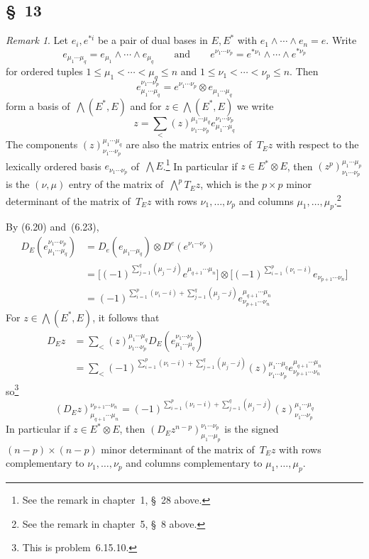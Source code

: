 \documentclass[letterpaper,12pt]{article}
\newcommand{\tprod}{\otimes}
\newcommand{\eprod}{\wedge}
\newcommand{\bigeprod}{\bigwedge}
\newcommand{\medeprod}{{\textstyle\bigeprod}}
\newcommand{\multi}[4]{#2_{#3}#1\cdots#1#2_{#4}}
\newcommand{\eprods}[3]{\multi{\eprod}{#1}{#2}{#3}}
\theoremstyle{definition}
\theoremstyle{remark}
\newtheorem*{rmk}{Remark}
\begin{document}
\subsection*{\S~13}
\begin{rmk}
Let \(e_i,e^{*i}\) be a pair of dual bases in \(E,E^*\) with \(\eprods{e}{1}{n}=e\). Write
\[e_{\mu_1\cdots\mu_q}=\eprods{e}{\mu_1}{\mu_q}\qquad\text{and}\qquad e^{\nu_1\cdots\nu_p}=e^{*\nu_1}\eprod\cdots\eprod e^{*\nu_p}\]
for ordered tuples \(1\le\mu_1<\cdots<\mu_q\le n\) and \(1\le\nu_1<\cdots<\nu_p\le n\). Then
\[e_{\mu_1\cdots\mu_q}^{\nu_1\cdots\nu_p}=e^{\nu_1\cdots\nu_p}\tprod e_{\mu_1\cdots\mu_q}\]
form a basis of~\(\medeprod(E^*,E)\) and for \(z\in\medeprod(E^*,E)\) we write
\[z=\sum_{<}(z)^{\mu_1\cdots\mu_q}_{\nu_1\cdots\nu_p}e_{\mu_1\cdots\mu_q}^{\nu_1\cdots\nu_p}\]
The components \((z)^{\mu_1\cdots\mu_q}_{\nu_1\cdots\nu_p}\) are also the matrix entries of~\(T_Ez\) with respect to the lexically ordered basis \(e_{\nu_1\cdots\nu_p}\) of~\(\medeprod E\).\footnote{See the remark in chapter~1, \S~28 above.} In particular if \(z\in E^*\tprod E\), then \((z^p)^{\mu_1\cdots\mu_p}_{\nu_1\cdots\nu_p}\) is the \((\nu,\mu)\) entry of the matrix of~\(\medeprod^p T_Ez\), which is the \(p\times p\) minor determinant of the matrix of~\(T_Ez\) with rows \(\nu_1,\ldots,\nu_p\) and columns \(\mu_1,\ldots,\mu_p\).\footnote{See the remark in chapter~5, \S~8 above.}

By (6.20) and~(6.23),
\begin{align*}
D_E(e_{\mu_1\cdots\mu_q}^{\nu_1\cdots\nu_p})&=D_e(e_{\mu_1\cdots\mu_q})\tprod D^e(e^{\nu_1\cdots\nu_p})\\
	&=\bigl[(-1)^{\sum_{j=1}^q(\mu_j-j)}e^{\mu_{q+1}\cdots\mu_n}\bigr]\tprod\bigl[(-1)^{\sum_{i=1}^p(\nu_i-i)}e_{\nu_{p+1}\cdots\nu_n}\bigr]\\
	&=(-1)^{\sum_{i=1}^p(\nu_i-i)+\sum_{j=1}^q(\mu_j-j)}e_{\nu_{p+1}\cdots\nu_n}^{\mu_{q+1}\cdots\mu_n}
\end{align*}
For \(z\in\medeprod(E^*,E)\), it follows that
\begin{align*}
D_E z&=\sum_{<}(z)^{\mu_1\cdots\mu_q}_{\nu_1\cdots\nu_p}D_E(e_{\mu_1\cdots\mu_q}^{\nu_1\cdots\nu_p})\\
	&=\sum_{<}(-1)^{\sum_{i=1}^p(\nu_i-i)+\sum_{j=1}^q(\mu_j-j)}(z)^{\mu_1\cdots\mu_q}_{\nu_1\cdots\nu_p}e_{\nu_{p+1}\cdots\nu_n}^{\mu_{q+1}\cdots\mu_n}
\end{align*}
so\footnote{This is problem~6.15.10.}
\[(D_E z)^{\nu_{p+1}\cdots\nu_n}_{\mu_{q+1}\cdots\mu_n}=(-1)^{\sum_{i=1}^p(\nu_i-i)+\sum_{j=1}^q(\mu_j-j)}(z)^{\mu_1\cdots\mu_q}_{\nu_1\cdots\nu_p}\]
In particular if \(z\in E^*\tprod E\), then \((D_E z^{n-p})^{\nu_1\cdots\nu_p}_{\mu_1\cdots\mu_p}\) is the signed \((n-p)\times(n-p)\) minor determinant of the matrix of~\(T_Ez\) with rows complementary to \(\nu_1,\ldots,\nu_p\) and columns complementary to \(\mu_1,\ldots,\mu_p\).
\end{rmk}
\end{document}
